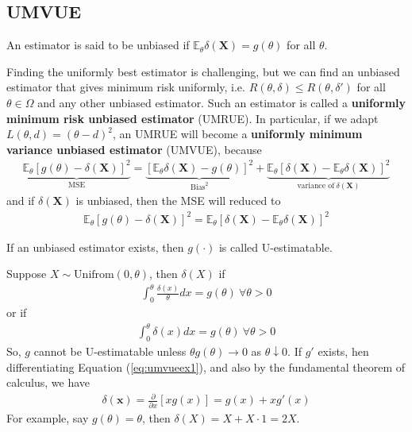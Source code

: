 
\subsection{UMVUE}

\begin{definition}
    An estimator is said to be unbiased 
    if $\mathbb{E}_\theta\delta(\boldsymbol{X})=g(\theta)$ for all $\theta$.
\end{definition}

Finding the uniformly best estimator is challenging,
but we can  find an unbiased estimator that gives minimum risk uniformly,
i.e. $R(\theta,\delta)\leq R(\theta,\delta')$ for all $\theta\in\Omega$
and any other unbiased estimator.
Such an estimator is called a \textbf{uniformly minimum risk unbiased estimator} (UMRUE).
In particular, if we adapt $L(\theta, d)=(\theta-d)^2$,
an UMRUE will become a \textbf{uniformly minimum variance unbiased estimator} (UMVUE), because
\begin{gather}
    \underbrace{\mathbb{E}_\theta[g(\theta)-\delta(\boldsymbol{X})]^2}_{\text{MSE}}
    =\underbrace{[\mathbb{E}_\theta\delta(\boldsymbol{X})-g(\theta)]^2}_{\text{Bias}^2}
    +\underbrace{\mathbb{E}_\theta[\delta(\boldsymbol{X})-\mathbb{E}_\theta\delta(\boldsymbol{X})]^2}_{\text{variance of}~\delta(\boldsymbol{X})}
\end{gather}
and if $\delta(\boldsymbol{X})$ is unbiased,
then the MSE will reduced to 
\begin{gather}
    \mathbb{E}_\theta[g(\theta)-\delta(\boldsymbol{X})]^2
    =\mathbb{E}_\theta[\delta(\boldsymbol{X})-\mathbb{E}_\theta\delta(\boldsymbol{X})]^2
\end{gather}

\begin{definition}[U-estimatable]
    If an unbiased estimator exists, then $g(\cdot)$ is called U-estimatable.
\end{definition}

\begin{example}
    Suppose $X\sim\text{Unifrom}(0,\theta)$, then $\delta({X})$ if 
    \begin{gather}
        \int_0^\theta\frac{\delta({x})}{\theta}d{x}=g(\theta)~\forall{\theta}>0
    \end{gather}
    or if 
    \begin{gather}
        \int_0^\theta \delta({x})d{x}=g(\theta)~\forall{\theta}>0 \label{eq:umvueex1}
    \end{gather}
    So, $g$ cannot be U-estimatable unless $\theta g(\theta)\to 0$ as $\theta\downarrow 0$.
    If $g'$ exists, hen differentiating Equation (\ref{eq:umvueex1}),
    and also by the fundamental theorem of calculus, we have
    \begin{gather}
        \delta(\boldsymbol{x})=\frac{\partial}{\partial{x}}[xg(x)]=g(x)+xg'(x)
    \end{gather}
    For example, say $g(\theta)=\theta$, then $\delta(X)=X+X\cdot 1=2X$.
\end{example}


